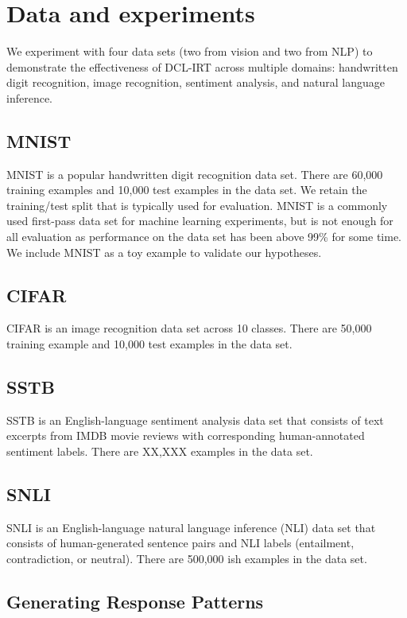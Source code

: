 \documentclass[letterpaper]{article} %
\begin{document}
\section{Data and experiments} 

We experiment with four data sets (two from vision and two from NLP) to demonstrate the effectiveness of DCL-IRT across multiple domains: handwritten digit recognition, image recognition, sentiment analysis, and natural language inference.

\subsection{MNIST}

MNIST is a popular handwritten digit recognition data set.
There are 60,000 training examples and 10,000 test examples in the data set.
We retain the training/test split that is typically used for evaluation.
MNIST is a commonly used first-pass data set for machine learning experiments, but is not enough for all evaluation as performance on the data set has been above 99\% for some time.
We include MNIST as a toy example to validate our hypotheses.

\subsection{CIFAR} 

CIFAR is an image recognition data set across 10 classes.
There are 50,000 training example and 10,000 test examples in the data set.

\subsection{SSTB} 

SSTB is an English-language sentiment analysis data set that consists of text excerpts from IMDB movie reviews with corresponding human-annotated sentiment labels.
There are XX,XXX examples in the data set.

\subsection{SNLI} 

SNLI is an English-language natural language inference (NLI) data set that consists of human-generated sentence pairs and NLI labels (entailment, contradiction, or neutral).
There are 500,000 ish examples in the data set.

\subsection{Generating Response Patterns}
\end{document}

